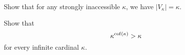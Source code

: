 \begin{sproblem}
	\label{prob:strongly_inaccessible}
	Show that for any strongly inaccessible $\kappa$,
	we have $\left\lvert V_\kappa \right\rvert = \kappa$.
\end{sproblem}

\begin{problem}
	Show that \[ \kappa^{\operatorname{cof}(\kappa)} > \kappa \] for every infinite cardinal $\kappa$.
\end{problem}
